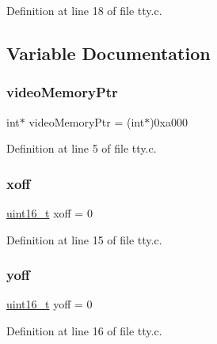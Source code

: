 Definition at line 18 of file tty.\+c.



\subsection{Variable Documentation}
\mbox{\label{a00032_a3f896e9c00b9302e2287aad054199134_a3f896e9c00b9302e2287aad054199134}} 
\subsubsection{\texorpdfstring{video\+Memory\+Ptr}{videoMemoryPtr}}
{\footnotesize\ttfamily int$\ast$ video\+Memory\+Ptr = (int$\ast$)0xa000}



Definition at line 5 of file tty.\+c.

\mbox{\label{a00032_abaa0d20f0e52ce0d3a7d706f6ac16266_abaa0d20f0e52ce0d3a7d706f6ac16266}} 
\subsubsection{\texorpdfstring{xoff}{xoff}}
{\footnotesize\ttfamily \hyperlink{a00026_a273cf69d639a59973b6019625df33e30_a273cf69d639a59973b6019625df33e30}{uint16\+\_\+t} xoff = 0}



Definition at line 15 of file tty.\+c.

\mbox{\label{a00032_a1a7539764d0ae8cd06ce45c62cf92bca_a1a7539764d0ae8cd06ce45c62cf92bca}} 
\subsubsection{\texorpdfstring{yoff}{yoff}}
{\footnotesize\ttfamily \hyperlink{a00026_a273cf69d639a59973b6019625df33e30_a273cf69d639a59973b6019625df33e30}{uint16\+\_\+t} yoff = 0}



Definition at line 16 of file tty.\+c.

